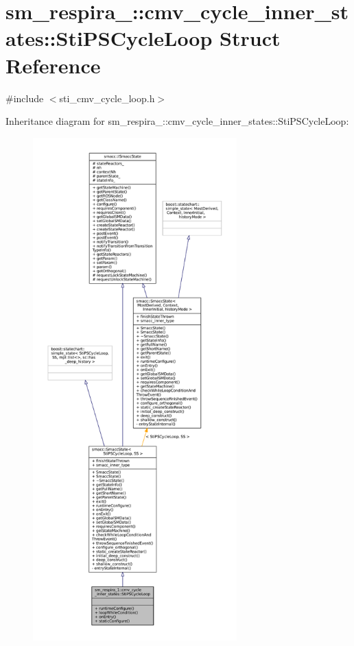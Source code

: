 \hypertarget{structsm__respira__1_1_1cmv__cycle__inner__states_1_1StiPSCycleLoop}{}\section{sm\+\_\+respira\+\_\+:\+:cmv\+\_\+cycle\+\_\+inner\+\_\+states\+:\+:Sti\+P\+S\+Cycle\+Loop Struct Reference}
\label{structsm__respira__1_1_1cmv__cycle__inner__states_1_1StiPSCycleLoop}


{\ttfamily \#include $<$sti\+\_\+cmv\+\_\+cycle\+\_\+loop.\+h$>$}



Inheritance diagram for sm\+\_\+respira\+\_\+:\+:cmv\+\_\+cycle\+\_\+inner\+\_\+states\+:\+:Sti\+P\+S\+Cycle\+Loop\+:
\nopagebreak
\begin{figure}[H]
\begin{center}
\leavevmode
\includegraphics[height=550pt]{structsm__respira__1_1_1cmv__cycle__inner__states_1_1StiPSCycleLoop__inherit__graph}
\end{center}
\end{figure}


